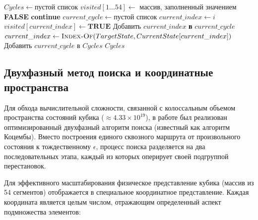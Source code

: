 \documentclass{article}
\begin{document}
\begin{algorithm}
\caption{Поиск непересекающихся циклов}
\label{alg:find-cycles}
\begin{algorithmic}[1]
    \State $Cycles \gets\textbf{пустой список}$ 
    \State $visited[1\dots54]\gets$ массив, заполненный значением \textbf{FALSE}
            \State \textbf{continue}
        \EndIf
        \State $current\_cycle\gets\textbf{пустой список}$
        \State $current\_index \gets i$
            \State $visited[current\_index]\gets\textbf{TRUE}$
            \State $\textbf{Добавить }current\_index$\textbf{ в }$current\_cycle$
            \State $current\_index \gets \Call{Index-Of}{TargetState, CurrentState[current\_index]}$
        \EndWhile
        \State $\textbf{Добавить }current\_cycle\textbf{ в }Cycles$
    \EndFor
    \State \Return $Cycles$
\EndProcedure
\end{algorithmic}
\end{algorithm}

\subsection{Двухфазный метод поиска и координатные пространства}
Для обхода вычислительной сложности, связанной с колоссальным объемом пространства состояний кубика ($\approx 4.33 \times 10^{19}$), в работе был реализован оптимизированный двухфазный алгоритм поиска (известный как алгоритм Коцембы). Вместо построения единого сквозного маршрута от произвольного состояния к тождественному $\epsilon$, процесс поиска разделяется на два последовательных этапа, каждый из которых оперирует своей подгруппой перестановок.

Для эффективного масштабирования физическое представление кубика (массив из 54 сегментов) отображается в специальное координатное представление. Каждая координата является целым числом, отражающим определенный аспект подмножества элементов:
\end{document}
